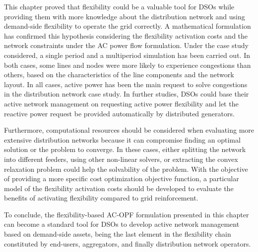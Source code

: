 This chapter proved that flexibility could be a valuable tool for DSOs while providing them with more knowledge about the distribution network and using demand-side flexibility to operate the grid correctly. 
A mathematical formulation has confirmed this hypothesis considering the flexibility activation costs and the network constraints under the AC power flow formulation. Under the case study considered, a single period and a multiperiod simulation has been carried out. In both cases, some lines and nodes were more likely to experience congestions than others, based on the characteristics of the line components and the network layout. In all cases, active power has been the main request to solve congestions in the distribution network case study. In further studies, DSOs could base their active network management on requesting active power flexibility and let the reactive power request be provided automatically by distributed generators.  

Furthermore, computational resources should be considered when evaluating more extensive distribution networks because it can compromise finding an optimal solution or the problem to converge. In these cases, either splitting the network into different feeders, using other non-linear solvers, or extracting the convex relaxation problem could help the solvability of the problem. With the objective of providing a more specific cost optimization objective function, a particular model of the flexibility activation costs should be developed to evaluate the benefits of activating flexibility compared to grid reinforcement. 

To conclude, the flexibility-based AC-OPF formulation presented in this chapter can become a standard tool for DSOs to develop active network management based on demand-side assets, being the last element in the flexibility chain constituted by end-users, aggregators, and finally distribution network operators. 